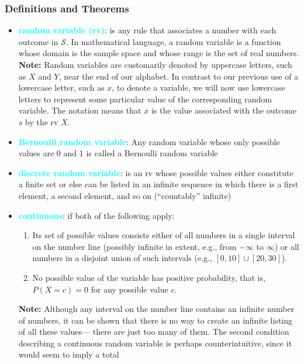 \documentclass{report}
\begin{document}
    \subsubsection{Definitions and Theorems}
    \begin{itemize}
        \item \textbf{\textcolor{cyan}{random variable (rv)}}: is
            any rule that associates a number with each outcome in $\mathcal{S}$. In mathematical
            language, a random variable is a function whose domain is the sample space
            and whose range is the set of real numbers.
            \bigbreak \noindent 
            \textbf{Note:} Random variables are customarily denoted by uppercase letters, such as $X$ and
            $Y$, near the end of our alphabet. In contrast to our previous use of a lowercase letter,
            such as $x$, to denote a variable, we will now use lowercase letters to represent some
            particular value of the corresponding random variable. The notation means
            that $x$ is the value associated with the outcome $s$ by the rv $X$.
        \item \textbf{\textcolor{cyan}{Bernoulli random variable}}: Any random variable whose only possible values are 0 and 1 is called a Bernoulli random variable
        \item \textbf{\textcolor{cyan}{discrete random variable}}: is an rv whose possible values either constitute a finite set or else can be listed in an infinite sequence in which there is a first element, a second element, and so on (“countably” infinite)
        \item \textbf{\textcolor{cyan}{continuous}}: if both of the following apply:
        \begin{enumerate}
            \item Its set of possible values consists either of all numbers in a single interval on the number line (possibly infinite in extent, e.g., from $-\infty$ to $\infty$) or all numbers in a disjoint union of such intervals (e.g., $[0, 10] \cup [20, 30]$).
            \item No possible value of the variable has positive probability, that is, $P(X = c) = 0$ for any possible value $c$.
        \end{enumerate}
        \bigbreak \noindent 
        \textbf{Note:} Although any interval on the number line contains an infinite number of numbers, it
can be shown that there is no way to create an infinite listing of all these values—
there are just too many of them. The second condition describing a continuous random variable is perhaps counterintuitive, since it would seem to imply a total

\end{itemize}
\end{document}

